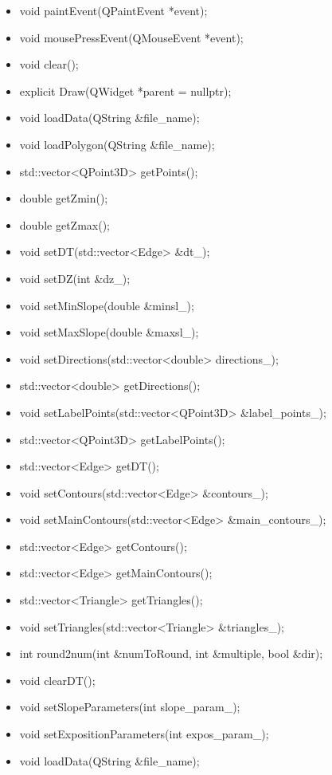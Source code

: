 \documentclass[11pt]{article}
\begin{document}
\begin{itemize}
\item void paintEvent(QPaintEvent *event);
\item void mousePressEvent(QMouseEvent *event);
\item void clear();
\item explicit Draw(QWidget *parent = nullptr);
\item void loadData(QString \&file\_name);
\item void loadPolygon(QString \&file\_name);
\item std::vector<QPoint3D> getPoints();
\item double getZmin();
\item double getZmax();
\item void setDT(std::vector<Edge> \&dt\_);
\item void setDZ(int \&dz\_);
\item void setMinSlope(double \&minsl\_);
\item void setMaxSlope(double \&maxsl\_);
\item void setDirections(std::vector<double> directions\_);
\item std::vector<double> getDirections();
\item void setLabelPoints(std::vector<QPoint3D> \&label\_points\_);
\item std::vector<QPoint3D> getLabelPoints();
\item std::vector<Edge> getDT();
\item void setContours(std::vector<Edge> \&contours\_);
\item void setMainContours(std::vector<Edge> \&main\_contours\_);
\item std::vector<Edge> getContours();
\item std::vector<Edge> getMainContours();
\item std::vector<Triangle> getTriangles();
\item void setTriangles(std::vector<Triangle> \&triangles\_);
\item int round2num(int \&numToRound, int \&multiple, bool \&dir);
\item void clearDT();
\item void setSlopeParameters(int slope\_param\_);
\item void setExpositionParameters(int expos\_param\_);
\item void loadData(QString \&file\_name);
\end{itemize}
\end{document}
